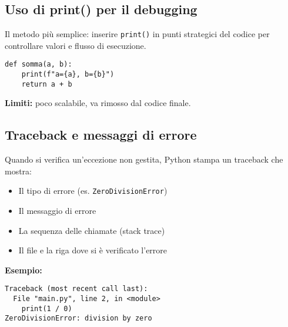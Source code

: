 \documentclass[a4paper,12pt]{article}
\begin{document}
\subsection*{Uso di print() per il debugging}
Il metodo più semplice: inserire \texttt{print()} in punti strategici del codice per controllare valori e flusso di esecuzione.
\begin{lstlisting}
def somma(a, b):
    print(f"a={a}, b={b}")
    return a + b
\end{lstlisting}
\textbf{Limiti:} poco scalabile, va rimosso dal codice finale.

\subsection*{Traceback e messaggi di errore}
Quando si verifica un'eccezione non gestita, Python stampa un traceback che mostra:
\begin{itemize}
    \item Il tipo di errore (es. \texttt{ZeroDivisionError})
    \item Il messaggio di errore
    \item La sequenza delle chiamate (stack trace)
    \item Il file e la riga dove si è verificato l'errore
\end{itemize}
\textbf{Esempio:}
\begin{lstlisting}
Traceback (most recent call last):
  File "main.py", line 2, in <module>
    print(1 / 0)
ZeroDivisionError: division by zero
\end{lstlisting}
\end{document}
